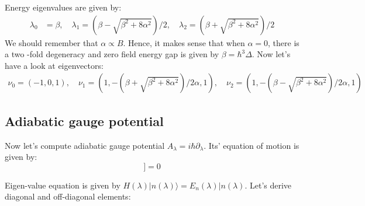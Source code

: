 \documentclass[11pt,a4paper]{article}
\begin{document}
 Energy eigenvalues are given by:
\begin{align*}
\lambda_0 &= \beta, \quad \lambda_1 = (\beta - \sqrt{\beta^2 + 8 \alpha^2})/2 , \quad  \lambda_2 = (\beta + \sqrt{\beta^2 + 8 \alpha^2})/2
\end{align*}
We should remember that $\alpha \propto B$. Hence, it makes sense that when $\alpha=0$,  there is a two -fold degeneracy and zero field energy gap is given by $\beta=\hbar^3 \Delta$. Now let's have a look at eigenvectors:
\begin{align*}
\nu_0 = (-1,0,1), \quad \nu_1 = (1, -(\beta + \sqrt{\beta^2 + 8 \alpha^2})/2 \alpha, 1) , \quad \nu_2 = (1, -(\beta - \sqrt{\beta^2 + 8 \alpha^2})/2 \alpha, 1)
\end{align*}

\subsection{Adiabatic gauge potential}

Now let's compute adiabatic gauge potential $A_{\lambda}= i \hbar \partial_{\lambda}$. Its' equation of motion is given by:
\begin{equation}
[H, \partial_{\lambda} H +\dfrac{i}{\hbar} [A_{\lambda}, H] ]=0
\label{eom}
\end{equation}

Eigen-value equation is given by $H (\lambda) |n(\lambda) \rangle = E_n (\lambda) |n(\lambda) $. Let's derive diagonal and off-diagonal elements:
\end{document}
